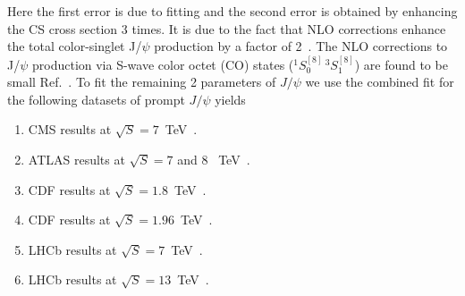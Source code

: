 \documentclass[12pt,a4paper,final]{iopart}
\begin{document}
{\color{black}
 Here the first error is due to fitting and the second error is 
 obtained by enhancing the CS cross section 3 times. 
 It is due to the fact that NLO corrections enhance the total color-singlet J/$\psi$ 
 production by a factor of 2~\cite{Gong:2008sn}.
 The NLO corrections to J/$\psi$ production via S-wave color octet (CO) states 
 ($^1S_{0}^{[8]}\,^3S_{1}^{[8]}$) are found to be small Ref.~\cite{Gong:2008ft}.
}
To fit the remaining 2 parameters of $J/\psi$ we use the combined fit for the
following datasets of prompt $J/\psi$ yields
\begin{enumerate}
\item{CMS results at $\sqrt{S}=7$~TeV~\cite{Chatrchyan:2011kc,Khachatryan:2015rra}}.
\item{ATLAS results at $\sqrt{S}=7$ and 8 ~TeV~\cite{Aad:2015duc}}.
\item{CDF results at $\sqrt{S}=1.8$~TeV~\cite{Abe:1997jz}}.
\item{CDF results at $\sqrt{S}=1.96$~TeV~\cite{Acosta:2004yw}}.
\item{LHCb results at $\sqrt{S}=7$~TeV~\cite{Aaij:2011jh}}.
\item{LHCb results at $\sqrt{S}=13$~TeV~\cite{Aaij:2015rla}}.
\end{enumerate}
\end{document}
